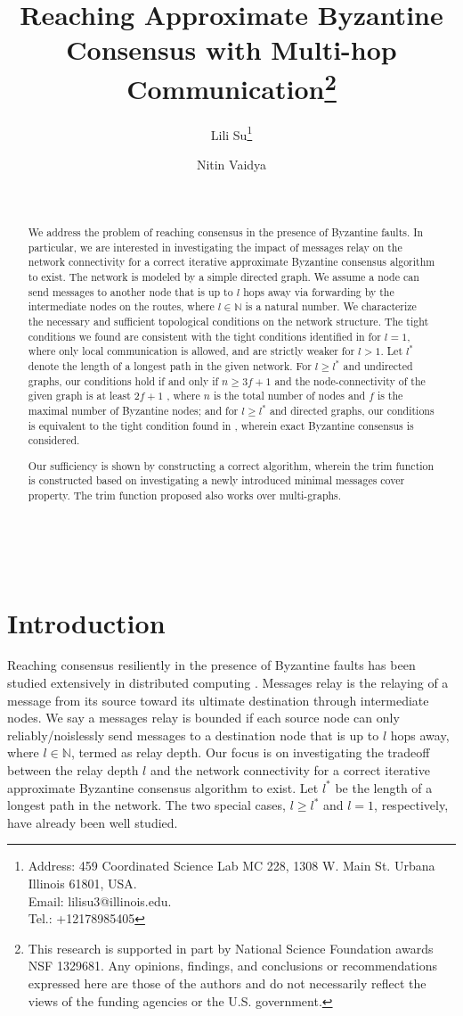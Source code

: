 \documentclass[letterpaper, 11pt]{article}
\title{Reaching Approximate Byzantine Consensus with Multi-hop Communication\thanks{This research is supported in part by National Science Foundation awards NSF 1329681.
Any opinions, findings, and conclusions or recommendations expressed here are those of the authors
and do not necessarily reflect the views of the funding agencies or the U.S. government.}
}
\author{Lili Su\thanks{Address: 459 Coordinated Science Lab MC 228, 1308 W. Main St.
Urbana Illinois 61801, USA. \\
Email: lilisu3@illinois.edu. \\
Tel.: +12178985405
}}
\author{Nitin Vaidya}
\affil{ Department of Electrical and Computer Engineering\\ University of Illinois at Urbana-Champaign}
\newcommand{\naturals}{{\mathbb{N}}}
\begin{document}
\date{~}

\maketitle



~
\begin{abstract}
We address the problem of reaching consensus in the presence of Byzantine faults. In particular, we are interested in investigating the impact of messages relay on the network connectivity for a correct iterative approximate Byzantine consensus algorithm to exist.
The network is modeled by a simple directed graph. We assume a node can send messages to another node that is up to $l$ hops away via forwarding by the intermediate nodes on the routes,
where $l\in \naturals$ is a natural number. We characterize the necessary and sufficient topological conditions on the network structure. The tight conditions we found are consistent with the tight conditions identified in \cite{Vaidya2012IABC} for $l=1$, where only local communication is allowed, and are strictly weaker
for $l>1$. Let $l^*$ denote the length of a longest path in the given network.  For $l\ge l^*$ and undirected graphs, our conditions hold if and only if  $n\ge 3f+1$ and the node-connectivity of the given graph is at least $2f+1$ , where $n$ is the total number of nodes and $f$ is the maximal number of Byzantine nodes; and for $l\ge l^*$ and directed graphs, our conditions is equivalent to the tight condition found in \cite{Tseng2014}, wherein exact Byzantine consensus is considered.

Our sufficiency is shown by constructing a correct algorithm, wherein the trim function is constructed based on investigating a newly introduced minimal messages cover property.
The trim function proposed also works over multi-graphs.


\end{abstract}





\newpage
\section{Introduction}
\label{sec:intro}





 Reaching consensus resiliently in the presence of Byzantine faults has been studied extensively in distributed computing \cite{Lamport1982, Rabin1983, Ben-Or1983, AA_Fekete_aoptimal,Ben-Or2010}. Messages relay is the relaying of a message from its source toward its ultimate destination through intermediate nodes.
We say a messages relay is bounded if each source node can only reliably/noislessly send messages to a destination node that is up to $l$ hops away, where $l\in \naturals$, termed as relay depth. Our focus is on investigating the tradeoff between the relay depth $l$ and the network connectivity for a correct iterative approximate Byzantine consensus algorithm to exist. Let $l^*$ be the length of a longest path in the network. The two special cases, $l\ge l^*$ and $l=1$, respectively, have already been well studied.
\end{document}
